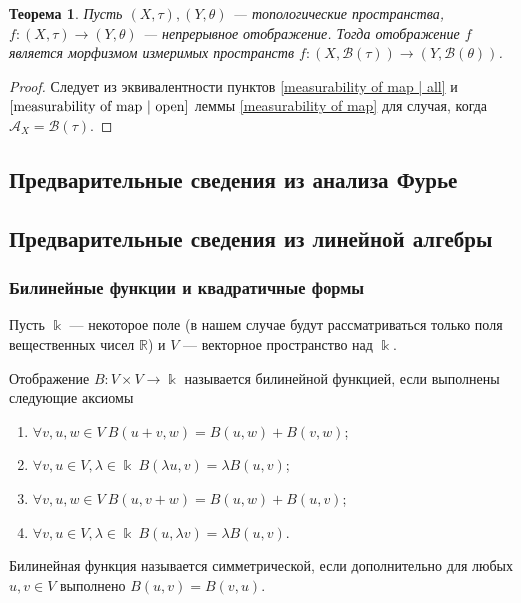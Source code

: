 \documentclass[12pt]{article}
\newtheorem{theorem}{Теорема}
\numberwithin{theorem}{section}
\theoremstyle{definition}
\newcommand{\defin}[2]{\hypertarget{#2}{{\color{red} #1}}}
\newcommand{\RR}{\mathbb{R}}
\newcommand{\calA}{\mathcal{A}}
\newcommand{\calB}{\mathcal{B}}
\begin{document}
	\begin{theorem} \label{borel functor}
		Пусть $ (X, \tau), (Y, \theta) $ --- топологические пространства,
		$ f \colon (X, \tau) \to (Y, \theta) $ --- непрерывное отображение.
		Тогда отображение $ f $ является морфизмом измеримых пространств
		$ f \colon (X, \calB(\tau)) \to (Y, \calB(\theta)) $.
	\end{theorem}
	
	\begin{proof}
		Следует из эквивалентности пунктов \ref{measurability of map | all}
		и $ \ref{measurability of map | open} $ леммы \ref{measurability of map} 
		для случая, когда $ \calA_X = \calB(\tau) $.
	\end{proof}
	
	\subsection{Предварительные сведения из анализа Фурье}
	
	\subsection{Предварительные сведения из линейной алгебры}
	
	\subsubsection{Билинейные функции и квадратичные формы}
	
	Пусть $ \Bbbk $ --- некоторое поле (в нашем случае будут рассматриваться только поля вещественных чисел $ \RR $) и $ V $ --- векторное пространство над $ \Bbbk $.
	
	Отображение $ B \colon V \times V \to \Bbbk $ называется \defin{билинейной функцией}{bilinear}, если выполнены следующие аксиомы
	\begin{enumerate}
		\item $ \forall v,u,w \in V \ B(u + v, w) = B(u, w) + B(v, w) $;
		\item $ \forall v,u \in V, \lambda \in \Bbbk \ B(\lambda u, v) = \lambda B(u, v) $;
		\item $ \forall v,u,w \in V \ B(u, v + w) = B(u, w) + B(u, v) $;
		\item $ \forall v,u \in V, \lambda \in \Bbbk \ B(u, \lambda v) = \lambda B(u, v) $.
	\end{enumerate}
	
	Билинейная функция называется \defin{симметрической}{symmetric}, если дополнительно для любых $ u, v \in V $ выполнено $ B(u, v) = B(v, u) $.
	
\end{document}
